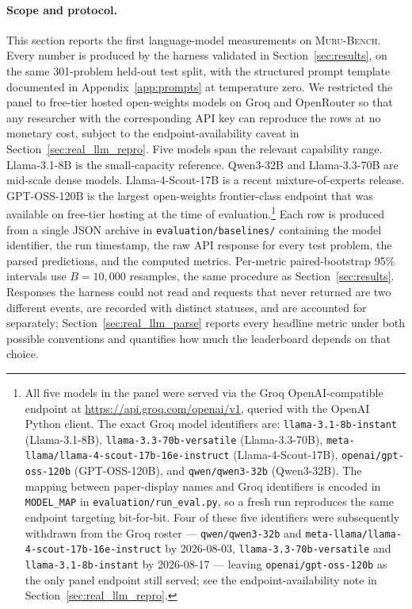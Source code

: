 \documentclass{article}
\newcommand{\muru}{\textsc{Muru-Bench}}
\begin{document}
\paragraph{Scope and protocol.}
This section reports the first language-model measurements on \muru{}. Every number is produced by the harness validated in Section~\ref{sec:results}, on the same 301-problem held-out test split, with the structured prompt template documented in Appendix~\ref{app:prompts} at temperature zero. We restricted the panel to free-tier hosted open-weights models on Groq and OpenRouter so that any researcher with the corresponding API key can reproduce the rows at no monetary cost, subject to the endpoint-availability caveat in Section~\ref{sec:real_llm_repro}. Five models span the relevant capability range. Llama-3.1-8B is the small-capacity reference. Qwen3-32B and Llama-3.3-70B are mid-scale dense models. Llama-4-Scout-17B is a recent mixture-of-experts release. GPT-OSS-120B is the largest open-weights frontier-class endpoint that was available on free-tier hosting at the time of evaluation.\footnote{All five models in the panel were served via the Groq OpenAI-compatible endpoint at \url{https://api.groq.com/openai/v1}, queried with the OpenAI Python client. The exact Groq model identifiers are: \texttt{llama-3.1-8b-instant} (Llama-3.1-8B), \texttt{llama-3.3-70b-versatile} (Llama-3.3-70B), \texttt{meta-llama/llama-4-scout-17b-16e-instruct} (Llama-4-Scout-17B), \texttt{openai/gpt-oss-120b} (GPT-OSS-120B), and \texttt{qwen/qwen3-32b} (Qwen3-32B). The mapping between paper-display names and Groq identifiers is encoded in \texttt{MODEL\_MAP} in \texttt{evaluation/run\_eval.py}, so a fresh run reproduces the same endpoint targeting bit-for-bit. Four of these five identifiers were subsequently withdrawn from the Groq roster --- \texttt{qwen/qwen3-32b} and \texttt{meta-llama/llama-4-scout-17b-16e-instruct} by 2026-08-03, \texttt{llama-3.3-70b-versatile} and \texttt{llama-3.1-8b-instant} by 2026-08-17 --- leaving \texttt{openai/gpt-oss-120b} as the only panel endpoint still served; see the endpoint-availability note in Section~\ref{sec:real_llm_repro}.} Each row is produced from a single JSON archive in \texttt{evaluation/baselines/} containing the model identifier, the run timestamp, the raw API response for every test problem, the parsed predictions, and the computed metrics. Per-metric paired-bootstrap 95\% intervals use $B = 10{,}000$ resamples, the same procedure as Section~\ref{sec:results}. Responses the harness could not read and requests that never returned are two different events, are recorded with distinct statuses, and are accounted for separately; Section~\ref{sec:real_llm_parse} reports every headline metric under both possible conventions and quantifies how much the leaderboard depends on that choice.
\end{document}
